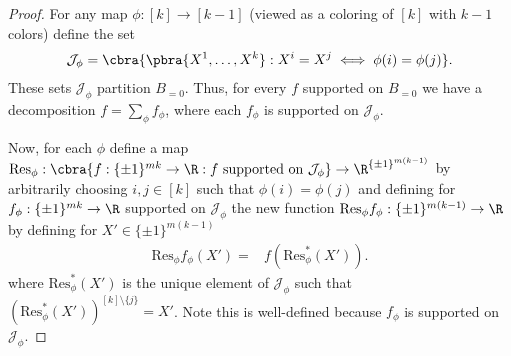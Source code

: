 \begin{proof}
    For any map $\phi:[k]\to[k-1]$ (viewed as a coloring of $[k]$ with $k-1$ colors) define the set 
    \begin{align*}
        \mathcal{J}_\phi = \cbra{\pbra{X^1,\dots,X^k}:X^i=X^j\iff \phi(i)=\phi(j)}.
    \end{align*}
    These sets $\mathcal{J}_\phi$ partition $B_{=0}$. Thus, for every $f$ supported on $B_{=0}$ we have a decomposition $f=\sum_{\phi}f_\phi$, where each $f_\phi$ is supported on $\mathcal{J}_\phi$. 

    Now, for each $\phi$ define a map $\mathrm{Res}_\phi:\cbra{f:{\{\pm1\}^{mk}}\to \R:f\text{ supported on }\mathcal{J}_\phi}\to \R^{\{\pm1\}^{m(k-1)}}$ by arbitrarily choosing $i,j\in[k]$ such that $\phi(i)=\phi(j)$ and defining for $f_\phi:\{\pm1\}^{mk}\to \R$ supported on $\mathcal{J}_{\phi}$ the new function $\mathrm{Res}_\phi f_\phi:\{\pm1\}^{m(k-1)}\to \R$ by defining for $X'\in \{\pm1\}^{m(k-1)}$
    \begin{align*}
        \mathrm{Res}_\phi f_\phi(X')=& f(\mathrm{Res}_\phi^*(X')).
    \end{align*}
    where $\mathrm{Res}_\phi^*(X')$ is the unique element of $\mathcal{J}_\phi$ such that $(\mathrm{Res}_\phi^*(X'))^{[k]\setminus\{j\}}=X'$. Note this is well-defined because $f_\phi$ is supported on $\mathcal{J}_\phi$.


\end{proof}
